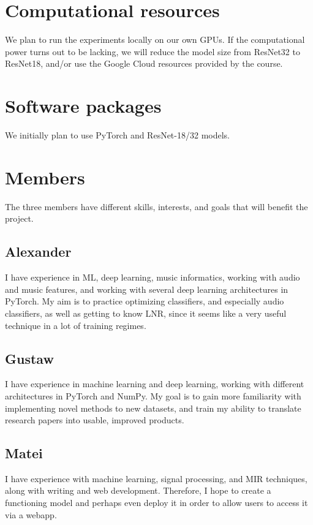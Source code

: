 \documentclass{article}
\begin{document}
\section{Computational resources}
We plan to run the experiments locally on our own GPUs. If the computational power turns out to be lacking, we will reduce the model size from ResNet32 to ResNet18, and/or use the Google Cloud resources provided by the course.

\section{Software packages}
We initially plan to use PyTorch and ResNet-18/32 models.

\section{Members}
The three members have different skills, interests, and goals that will benefit the project.

\subsection{Alexander}
I have experience in ML, deep learning, music informatics, working with audio and music features, and working with several deep learning architectures in PyTorch. My aim is to practice optimizing classifiers, and especially audio classifiers, as well as getting to know LNR, since it seems like a very useful technique in a lot of training regimes.

\subsection{Gustaw}
I have experience in machine learning and deep learning, working with different architectures in PyTorch and NumPy. My goal is to gain more familiarity with implementing novel methods to new datasets, and train my ability to translate research papers into usable, improved products.

\subsection{Matei}
I have experience with machine learning, signal processing, and MIR techniques, along with writing and web development. Therefore, I hope to create a functioning model and perhaps even deploy it in order to allow users to access it via a webapp.




\end{document}
